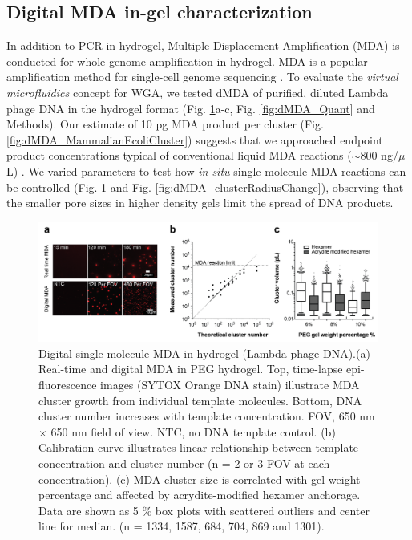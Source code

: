 \subsection{Digital MDA in-gel characterization}
In addition to PCR in hydrogel, Multiple Displacement Amplification (MDA) is conducted for whole genome amplification in hydrogel. MDA \cite{Dean:2002us} is a popular amplification method for single-cell genome sequencing \cite{Marcy:2007il,Fu:2015gl,Zhang:2006hq,Raghunathan:2005fg,Pamp:2012cj,Dodsworth:2013ih,Hess:2011gu}. To evaluate the \textit{virtual microfluidics} concept for WGA, we tested dMDA \cite{Morinishi:2015jx,Blainey:2011dt} of purified, diluted Lambda phage DNA in the hydrogel format (Fig. \ref{fig:dMDA}a-c, Fig. \ref{fig:dMDA_Quant} and Methods). Our estimate of 10 pg MDA product per cluster (Fig. \ref{fig:dMDA_MammalianEcoliCluster}) suggests that we approached endpoint product concentrations typical of conventional liquid MDA reactions (\ensuremath{\sim}800 ng\slash $\mu$L) \cite{Blainey:2013dp}. We varied parameters to test how \textit{in situ} single-molecule MDA reactions can be controlled (Fig. \ref{fig:dMDA} and Fig. \ref{fig:dMDA_clusterRadiusChange}), observing that the smaller pore sizes in higher density gels limit the spread of DNA products.

\begin{figure}
\centering
\includegraphics[keepaspectratio,width=1\textwidth]{./figures/Thesis-21.png}
\caption[Digital single-molecule MDA in hydrogel (Lambda phage DNA).]{Digital single-molecule MDA in hydrogel (Lambda phage DNA).(a) Real-time and digital MDA in PEG hydrogel. Top, time-lapse
epi-fluorescence images (SYTOX Orange DNA stain) illustrate MDA cluster growth from individual template molecules. Bottom, DNA cluster number increases with template concentration. FOV, 650 nm $\times$ 650 nm field of view. NTC, no DNA template control. (b) Calibration curve illustrates linear relationship between template concentration and cluster number (n = 2 or 3 FOV at
each concentration). (c) MDA cluster size is correlated with gel weight percentage and affected by acrydite-modified hexamer anchorage. Data are shown as 5 $\%$ box plots with scattered outliers and center line for median. (n = 1334, 1587, 684, 704, 869 and 1301).}
\label{fig:dMDA}
\end{figure}

